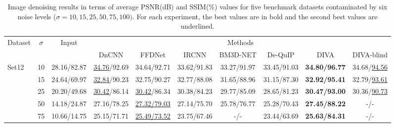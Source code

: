 \documentclass[10pt,journal,compsoc]{IEEEtran}
\newcommand\bdr[1]{{\textbf{#1}}}
\newcommand\bdb[1]{{\underline{#1}}}
\begin{document}
\begin{table*}[t!]

\begin{scriptsize}
\begin{center}
\caption{Image denoising results in terms of average PSNR(dB) and SSIM(\%) values for five benchmark datasets contaminated by six noise levels ($\sigma=10,15,25,50,75,100)$. For each experiment, the best values are in bold and the second best values are underlined.}
\label{tab:tab_psnr_ssim_image_denoising}
\begin{tabular}{l c c ccccccc}
\hline


Dataset & $\sigma$ & Input & \multicolumn{7}{c}{Methods}\\ 

& & & DnCNN\cite{Zhang2017beyond} & FFDNet\cite{Zhang2018FFDNet} & IRCNN\cite{Zhang2017learning} & BM3D-NET\cite{Yang2018bm3dnet} & De-QuIP\cite{dutta2022novel} & DIVA & DIVA-blind\\
\hline



\multirow{6}{*}{Set12}

& 10  & 28.16/82.87 & \bdb{34.76}/92.69 & 34.64/92.71 & 33.62/91.83 & 33.27/91.97 & 33.45/91.03 & \bdr{34.80/96.77} & 34.68/\bdb{94.56}\\

& 15  & 24.64/69.97 & \bdb{32.84}/90.23 & 32.75/90.27 & 32.77/88.08 & 31.65/88.96 & 31.15/87.30 & \bdr{32.92/95.41} & 32.79/\bdb{93.61}\\

& 25  & 20.20/49.68 & \bdb{30.42}/86.14 & \bdb{30.42}/86.34 & 30.38/84.23 & 29.77/85.09 & 28.65/81.23 & \bdr{30.47/93.00} & 30.36/\bdb{90.73}\\

& 50  & 14.18/24.87 & 27.16/78.25 & \bdb{27.32/79.03} & 27.14/75.70 & 25.78/76.77 & 25.28/70.43 & \bdr{27.45/88.22} & -/- \\

& 75  & 10.66/14.75 & 25.15/71.71 & \bdb{25.49/73.52} & 23.75/67.46 & -/- & 23.44/63.69 & \bdr{25.63/84.31} & -/- \\


\end{tabular}
\end{center}
\end{scriptsize}
\end{table*}
\end{document}
